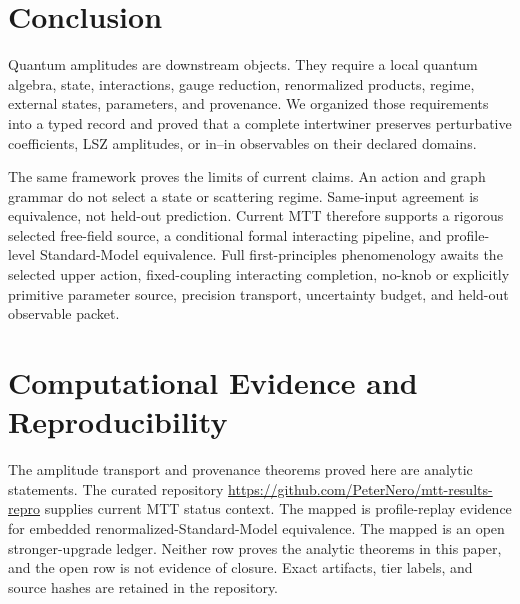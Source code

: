 \documentclass[11pt,a4paper]{article}
\numberwithin{equation}{section}
\theoremstyle{definition}
\theoremstyle{remark}
\begin{document}
\section{Conclusion}

Quantum amplitudes are downstream objects.  They require a local quantum
algebra, state, interactions, gauge reduction, renormalized products,
regime, external states, parameters, and provenance.  We organized those
requirements into a typed record and proved that a complete intertwiner
preserves perturbative coefficients, LSZ amplitudes, or in--in observables
on their declared domains.

The same framework proves the limits of current claims.  An action and
graph grammar do not select a state or scattering regime.  Same-input
agreement is equivalence, not held-out prediction.  Current MTT therefore
supports a rigorous selected free-field source, a conditional formal
interacting pipeline, and profile-level Standard-Model equivalence.  Full
first-principles phenomenology awaits the selected upper action,
fixed-coupling interacting completion, no-knob or explicitly primitive
parameter source, precision transport, uncertainty budget, and held-out
observable packet.

\section*{Computational Evidence and Reproducibility}
The amplitude transport and provenance theorems proved here are analytic
statements.  The curated repository
\url{https://github.com/PeterNero/mtt-results-repro} supplies current MTT
status context.  The mapped
 is profile-replay evidence for embedded
renormalized-Standard-Model equivalence.  The mapped
 is an open stronger-upgrade ledger.
Neither row proves the analytic theorems in this paper, and the open row is
not evidence of closure.  Exact artifacts, tier labels, and source hashes
are retained in the repository.



\end{document}

